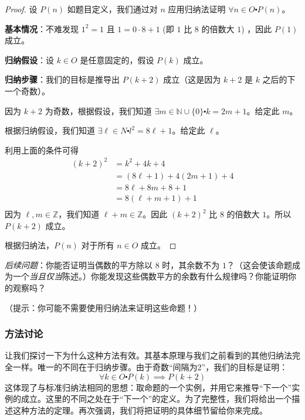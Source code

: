 \begin{proof}
    设 $P(n)$ 如题目定义，我们通过对 $n$ 应用归纳法证明 $\forall n \in O \centerdot P(n)$。

    \textbf{基本情况}：不难发现 $1^2=1$ 且 $1=0 \cdot 8 + 1$ (即 $1$ 比 $8$ 的倍数大 $1$) ，因此 $P(1)$ 成立。

    \textbf{归纳假设}：设 $k \in O$ 是任意固定的，假设 $P(k)$ 成立。

    \textbf{归纳步骤}：我们的目标是推导出 $P(k+2)$ 成立（这是因为 $k+2$ 是 $k$ 之后的下一个奇数）。

    因为 $k+2$ 为奇数，根据假设，我们知道 $\exists m \in \mathbb{N} \cup \{0\} \centerdot k = 2m+1$。给定此 $m$。

    根据归纳假设，我们知道 $\exists \ell \in N \centerdot l^2=8\ell+1$。给定此 $\ell$。

    利用上面的条件可得
    \begin{align*}
        (k + 2)^2 &= k^2 + 4k + 4 \\
        &= (8\ell + 1) + 4(2m + 1) + 4 \\
        &= 8\ell + 8m + 8 + 1 \\
        &= 8(\ell + m + 1) + 1 \\
    \end{align*}
    因为 $\ell, m \in \mathbb{Z}$，我们知道 $\ell+m \in \mathbb{Z}$。因此 $(k+2)^2$ 比 $8$ 的倍数大 $1$。所以 $P(k + 2)$ 成立。

    根据归纳法，$P(n)$ 对于所有 $n \in O$ 成立。
\end{proof}

\emph{后续问题}：你能否证明当偶数的平方除以 $8$ 时，其余数不为 $1$？（这会使该命题成为一个\emph{当且仅当}陈述。）你能发现这些偶数平方的余数有什么规律吗？你能证明你的观察吗？

（提示：你可能不需要使用归纳法来证明这些命题！）

\subsubsection*{方法讨论}

让我们探讨一下为什么这种方法有效。其基本原理与我们之前看到的其他归纳法完全一样。唯一的不同在于归纳步骤。由于奇数``间隔为2''，我们的目标是证明：
\[\forall k \in O \centerdot P(k) \implies P(k + 2)\]
这体现了与标准归纳法相同的思想：取命题的一个实例，并用它来推导``下一个''实例的成立。这里的不同之处在于``下一个''的定义。为了完整性，我们将给出一个描述这种方法的定理。再次强调，我们将把证明的具体细节留给你来完成。

